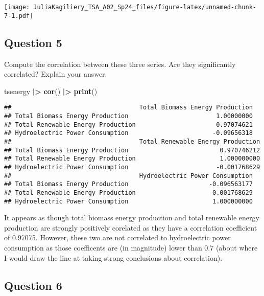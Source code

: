 \documentclass[
]{article}
\newenvironment{Shaded}{\begin{snugshade}}{\end{snugshade}}
\newcommand{\FunctionTok}[1]{\textcolor[rgb]{0.13,0.29,0.53}{\textbf{#1}}}
\newcommand{\NormalTok}[1]{#1}
\newcommand{\SpecialCharTok}[1]{\textcolor[rgb]{0.81,0.36,0.00}{\textbf{#1}}}
\begin{document}
\texttt{[image: JuliaKagiliery\_TSA\_A02\_Sp24\_files/figure-latex/unnamed-chunk-7-1.pdf]}

\hypertarget{question-5}{%
\subsection{Question 5}\label{question-5}}

Compute the correlation between these three series. Are they
significantly correlated? Explain your answer.

\begin{Shaded}
\begin{Highlighting}[]
\NormalTok{tsenergy }\SpecialCharTok{|\textgreater{}}
  \FunctionTok{cor}\NormalTok{() }\SpecialCharTok{|\textgreater{}}
  \FunctionTok{print}\NormalTok{()}
\end{Highlighting}
\end{Shaded}

\begin{verbatim}
##                                   Total Biomass Energy Production
## Total Biomass Energy Production                        1.00000000
## Total Renewable Energy Production                      0.97074621
## Hydroelectric Power Consumption                       -0.09656318
##                                   Total Renewable Energy Production
## Total Biomass Energy Production                         0.970746212
## Total Renewable Energy Production                       1.000000000
## Hydroelectric Power Consumption                        -0.001768629
##                                   Hydroelectric Power Consumption
## Total Biomass Energy Production                      -0.096563177
## Total Renewable Energy Production                    -0.001768629
## Hydroelectric Power Consumption                       1.000000000
\end{verbatim}

It appears as though total biomass energy production and total renewable
energy production are strongly positively corelated as they have a
correlation coefficient of 0.97075. However, these two are not
correlated to hydroelectric power consumption as those coefficents are
(in magnitude) lower than 0.7 (about where I would draw the line at
taking strong conclusions about correlation).

\hypertarget{question-6}{%
\subsection{Question 6}\label{question-6}}
\end{document}
